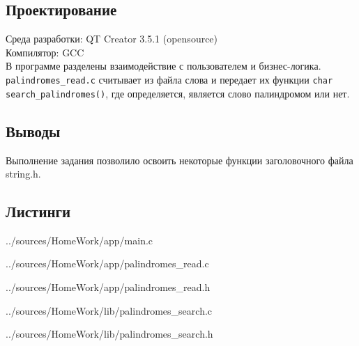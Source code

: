 \documentclass[12pt,a4paper]{report}
\begin{document}
\subsection{Проектирование}
Среда разработки: QT Creator 3.5.1 (opensource)
\\
Компилятор: GCC
\\
В программе разделены взаимодействие с пользователем и бизнес-логика. \verb+palindromes_read.c+ считывает из файла слова и передает их функции \verb+char search_palindromes()+, где определяется, является слово палиндромом или нет. 


\subsection{Выводы}
Выполнение задания позволило освоить некоторые функции заголовочного файла string.h.

\subsection*{Листинги}

{../sources/HomeWork/app/main.c}


{../sources/HomeWork/app/palindromes_read.c}


{../sources/HomeWork/app/palindromes_read.h}


{../sources/HomeWork/lib/palindromes_search.c}


{../sources/HomeWork/lib/palindromes_search.h}
\end{document}

